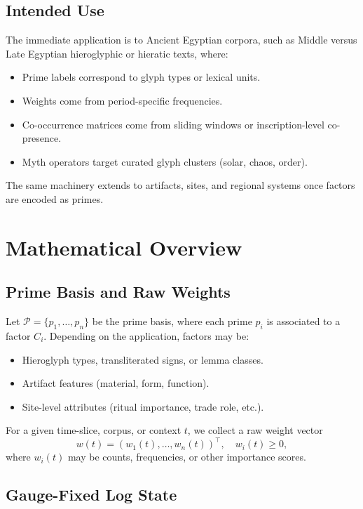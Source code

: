 \documentclass[11pt]{article}
\begin{document}
\subsection{Intended Use}

The immediate application is to Ancient Egyptian corpora, such as
Middle versus Late Egyptian hieroglyphic or hieratic texts, where:

\begin{itemize}[nosep]
  \item Prime labels correspond to glyph types or lexical units.
  \item Weights come from period-specific frequencies.
  \item Co-occurrence matrices come from sliding windows or inscription-level
        co-presence.
  \item Myth operators target curated glyph clusters (solar, chaos, order).
\end{itemize}

The same machinery extends to artifacts, sites, and regional systems
once factors are encoded as primes.

\section{Mathematical Overview}

\subsection{Prime Basis and Raw Weights}

Let \(\mathcal{P} = \{p_1,\dots,p_n\}\) be the prime basis, where each
prime \(p_i\) is associated to a factor \(C_i\). Depending on the
application, factors may be:
\begin{itemize}[nosep]
  \item Hieroglyph types, transliterated signs, or lemma classes.
  \item Artifact features (material, form, function).
  \item Site-level attributes (ritual importance, trade role, etc.).
\end{itemize}

For a given time-slice, corpus, or context \(t\), we collect a raw
weight vector
\[
w(t) = (w_1(t),\dots,w_n(t))^\top,\quad w_i(t)\ge 0,
\]
where \(w_i(t)\) may be counts, frequencies, or other importance scores.

\subsection{Gauge-Fixed Log State}
\end{document}
